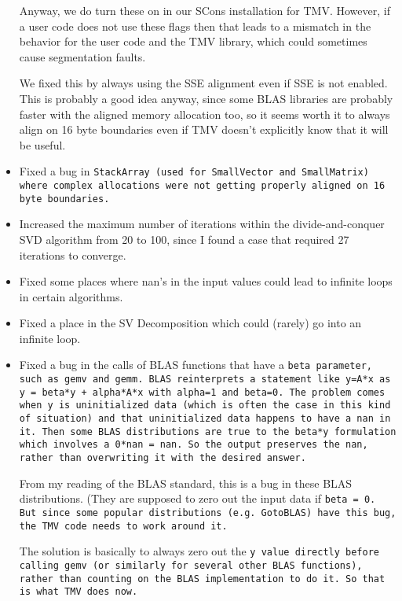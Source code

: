 \begin{itemize}
   Anyway, we do turn these on in our SCons installation for TMV.
   However, if a user code does not use these flags then that leads to a
   mismatch in the behavior for the user code and the TMV
   library, which could sometimes cause segmentation faults.

   We fixed this by always using the SSE alignment even if SSE is not
   enabled.  This is probably a good idea anyway, since some BLAS libraries
   are probably faster with the aligned memory allocation too, so it
   seems worth it to always align on 16 byte boundaries even if TMV
   doesn't explicitly know that it will be useful.

\item Fixed a bug in \tt{StackArray} (used for \tt{SmallVector} and \tt{SmallMatrix}) where
complex allocations were not getting properly aligned on 16 byte boundaries.

\item Increased the maximum number of iterations within the divide-and-conquer SVD
algorithm from 20 to 100, since I found a case that required 27 iterations to converge.

\item Fixed some places where nan's in the input values could lead to
infinite loops in certain algorithms. 

\item Fixed a place in the SV Decomposition which could (rarely) go into an infinite loop.

\item Fixed a bug in the calls of BLAS functions that have a
   \tt{beta} parameter, such as \tt{gemv} and \tt{gemm}.  
   BLAS reinterprets a statement like \tt{y=A*x} as
   \tt{y = beta*y + alpha*A*x} with \tt{alpha=1} and \tt{beta=0}.  The problem
   comes when \tt{y} is uninitialized data (which is often the case in this kind of
   situation) and that uninitialized data happens to have a \tt{nan} in it.
   Then some BLAS distributions are true to the \tt{beta*y} formulation which
   involves a \tt{0*nan = nan}.  So the output preserves the \tt{nan}, rather than
   overwriting it with the desired answer.
   
   From my reading of the BLAS standard, this is a bug in these BLAS distributions.
   (They are supposed to zero out the input data if \tt{beta = 0}.  But since some 
   popular distributions (e.g. GotoBLAS) have this bug, the TMV code needs to 
   work around it.

   The solution is basically to always zero out the \tt{y} value directly
   before calling \tt{gemv} (or similarly for several other BLAS functions), 
   rather than counting on the BLAS implementation to do it.  
   So that is what TMV does now.
   

\end{itemize}

